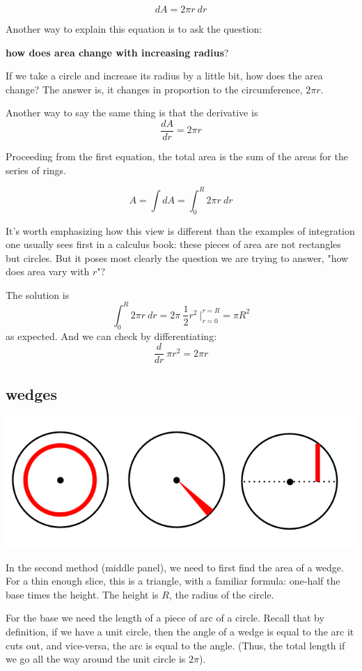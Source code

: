 \documentclass[11pt, oneside]{article}
\begin{document}
\[ dA = 2 \pi r \ dr \]

Another way to explain this equation is to ask the question:

\textbf{how does area change with increasing radius}?  

If we take a circle and increase its radius by a little bit, how does the area change?  The answer is, it changes in proportion to the circumference, $2 \pi r$.

Another way to say the same thing is that the derivative is
\[ \frac{dA}{dr} = 2 \pi r \]

Proceeding from the first equation, the total area is the sum of the areas for the series of rings.

\[ A = \int dA = \int_0^R 2 \pi r \ dr \]

It's worth emphasizing how this view is different than the examples of integration one usually sees first in a calculus book:  these pieces of area are not rectangles but circles.  But it poses most clearly the question we are trying to answer, "how does area vary with $r$"?

The solution is
\[ \int_0^R 2 \pi r \ dr = 2 \pi \ \frac{1}{2}r^2 \ \bigg|_{r=0}^{r=R} = \pi R^2\]
as expected.  And we can check by differentiating:
\[ \frac{d}{dr} \ \pi r^2 = 2 \pi r \]

\subsection*{wedges}
\begin{center}\includegraphics [scale=0.5] {circles3.png}\end{center}
In the second method (middle panel), we need to first find the area of a wedge.  For a thin enough slice, this is a triangle, with a familiar formula: one-half the base times the height.  The height is $R$, the radius of the circle.  

For the base we need the length of a piece of arc of a circle.  Recall that by definition, if we have a unit circle, then the angle of a wedge is equal to the arc it cuts out, and vice-versa, the arc is equal to the angle.  (Thus, the total length if we go all the way around the unit circle is $2 \pi$).  
\end{document}

